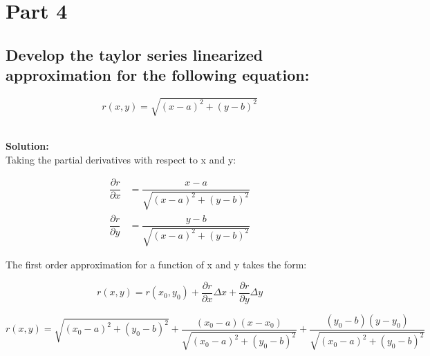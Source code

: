 \documentclass[12pt]{article}
\newcommand{\solution}{\textbf{\\Solution: \\}}
\begin{document}
  \clearpage
  \section{Part 4}
    \subsection*
    {
      Develop the taylor series linearized approximation for the following 
      equation:
    }
    \begin{equation*}
        r(x,y) = \sqrt{(x-a)^2 + (y-b)^2}
    \end{equation*}
    
    \solution
    \vspace{12pt}
    Taking the partial derivatives with respect to x and y:
    \vspace{10pt}

    \begin{equation}
      \begin{split}
        \dfrac{\partial r}{\partial x} &= \dfrac{x - a}{\sqrt{(x-a)^2 + (y-b)^2}} \\[12pt]
        \dfrac{\partial r}{\partial y} &= \dfrac{y - b}{\sqrt{(x-a)^2 + (y-b)^2}}
      \end{split}
    \end{equation}

    \vspace{10pt}
    The first order approximation for a function of x and y takes the form:
    \vspace{-6pt}

    \begin{equation}
      r(x,y) = r(x_0,y_0) + \dfrac{\partial r}{\partial x}\Delta x + 
                            \dfrac{\partial r}{\partial y}\Delta y
    \end{equation}

    \begin{equation}  
      r(x,y) = \sqrt{(x_0-a)^2 + (y_0-b)^2} + 
                \dfrac{(x_0 - a)(x-x_0)}{\sqrt{(x_0-a)^2 + (y_0-b)^2}} + 
                \dfrac{(y_0 - b)(y-y_0)}{\sqrt{(x_0-a)^2 + (y_0-b)^2}}
    \end{equation}
\end{document}
